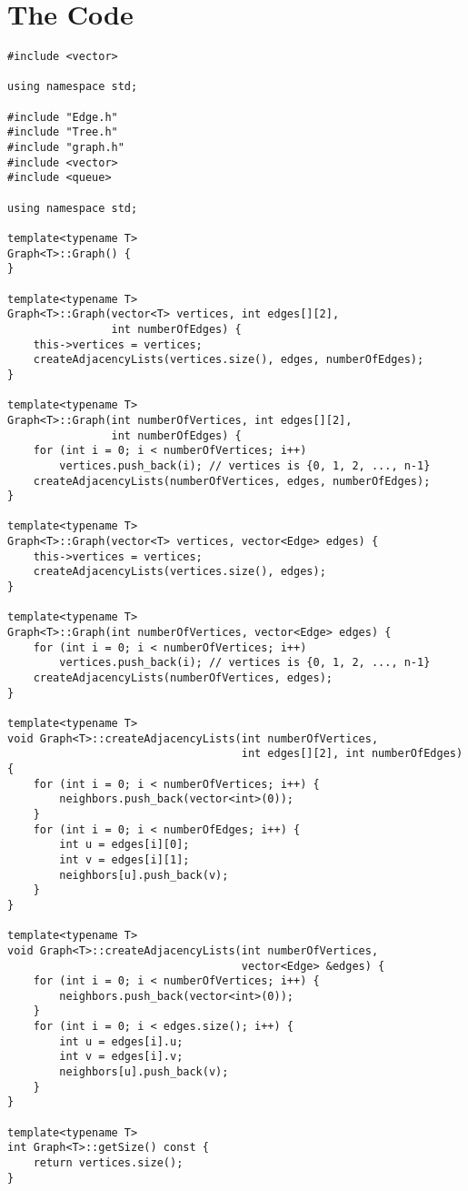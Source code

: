 \documentclass{article}
\begin{document}
\section{The Code}
\begin{lstlisting}
#include <vector>

using namespace std;

#include "Edge.h"
#include "Tree.h"
#include "graph.h"
#include <vector>
#include <queue>

using namespace std;

template<typename T>
Graph<T>::Graph() {
}

template<typename T>
Graph<T>::Graph(vector<T> vertices, int edges[][2],
                int numberOfEdges) {
    this->vertices = vertices;
    createAdjacencyLists(vertices.size(), edges, numberOfEdges);
}

template<typename T>
Graph<T>::Graph(int numberOfVertices, int edges[][2],
                int numberOfEdges) {
    for (int i = 0; i < numberOfVertices; i++)
        vertices.push_back(i); // vertices is {0, 1, 2, ..., n-1}
    createAdjacencyLists(numberOfVertices, edges, numberOfEdges);
}

template<typename T>
Graph<T>::Graph(vector<T> vertices, vector<Edge> edges) {
    this->vertices = vertices;
    createAdjacencyLists(vertices.size(), edges);
}

template<typename T>
Graph<T>::Graph(int numberOfVertices, vector<Edge> edges) {
    for (int i = 0; i < numberOfVertices; i++)
        vertices.push_back(i); // vertices is {0, 1, 2, ..., n-1}
    createAdjacencyLists(numberOfVertices, edges);
}

template<typename T>
void Graph<T>::createAdjacencyLists(int numberOfVertices,
                                    int edges[][2], int numberOfEdges) {
    for (int i = 0; i < numberOfVertices; i++) {
        neighbors.push_back(vector<int>(0));
    }
    for (int i = 0; i < numberOfEdges; i++) {
        int u = edges[i][0];
        int v = edges[i][1];
        neighbors[u].push_back(v);
    }
}

template<typename T>
void Graph<T>::createAdjacencyLists(int numberOfVertices,
                                    vector<Edge> &edges) {
    for (int i = 0; i < numberOfVertices; i++) {
        neighbors.push_back(vector<int>(0));
    }
    for (int i = 0; i < edges.size(); i++) {
        int u = edges[i].u;
        int v = edges[i].v;
        neighbors[u].push_back(v);
    }
}

template<typename T>
int Graph<T>::getSize() const {
    return vertices.size();
}


\end{lstlisting}
\end{document}
